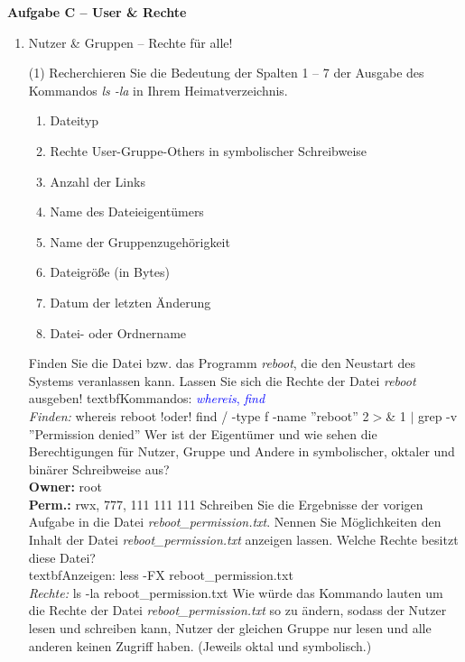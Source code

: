 \documentclass[paper=a4,fontsize=11pt]{scrartcl}%
\numberwithin{equation}{section}
\begin{document}
\begin{center}\Large{\textbf{Aufgabe C -- User \& Rechte}}\end{center}\vskip0.25in
\begin{enumerate}

\item Nutzer \& Gruppen -- Rechte für alle!
	\begin{tasks}(1)
        \task Recherchieren Sie die Bedeutung der Spalten 1 -- 7 der Ausgabe des Kommandos \emph{ls -la} in Ihrem Heimatverzeichnis.
        \begin{enumerate}
        		\item Dateityp
        		\item Rechte User-Gruppe-Others in symbolischer Schreibweise
        		\item Anzahl der Links
        		\item Name des Dateieigentümers
        		\item Name der Gruppenzugehörigkeit
        		\item Dateigröße (in Bytes)
        		\item Datum der letzten Änderung
        		\item Datei- oder Ordnername
        \end{enumerate}
        \task Finden Sie die Datei bzw. das Programm \textit{reboot}, die den Neustart des Systems veranlassen kann. Lassen Sie sich die Rechte der Datei \textit{reboot} ausgeben!
        textbf{Kommandos:} \textcolor{blue}{\emph{whereis}, \emph{find}}\\
        \textit{Finden:} whereis reboot !oder! find / -type f -name ''reboot'' 2$>$\& 1 $|$ grep -v ''Permission denied''
        \task Wer ist der Eigentümer und wie sehen die Berechtigungen für Nutzer, Gruppe und Andere in symbolischer, oktaler und binärer Schreibweise aus?\\
        \textbf{Owner:} root\\
        \textbf{Perm.:} rwx, 777, 111 111 111
        \task Schreiben Sie die Ergebnisse der vorigen Aufgabe in die Datei \textit{reboot\-\_permission.txt}.
        \task Nennen Sie Möglichkeiten den Inhalt der Datei \textit{reboot\-\_permission.txt} anzeigen lassen. Welche Rechte besitzt diese Datei?\\
        textbf{Anzeigen:} less -FX reboot\-\_permission.txt\\
        \textit{Rechte:} ls -la reboot\-\_permission.txt
        \task Wie würde das Kommando lauten um die Rechte der Datei \textit{reboot\-\_permission.txt} so zu ändern, sodass der Nutzer lesen und schreiben kann, Nutzer der gleichen Gruppe nur lesen und alle anderen keinen Zugriff haben. (Jeweils oktal und symbolisch.) \\

\end{tasks}
\end{enumerate}
\end{document}
